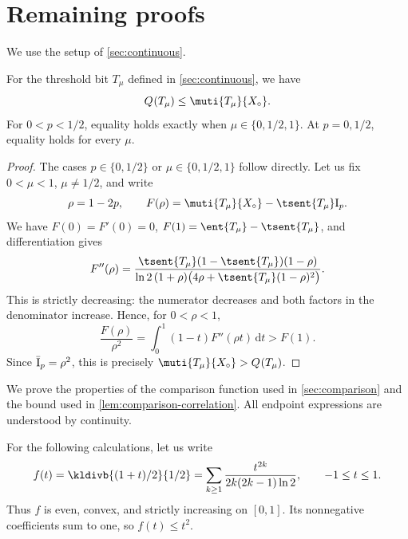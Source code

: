 \section{Remaining proofs}
\label{app:remaining}
\label{app:continuous}
\label{app:comparison}

We use the setup of \autoref{sec:continuous}.

\begin{lemma}
\label{lem:ck+vscontinuous}
For the threshold bit $T_\mu$ defined in \autoref{sec:continuous},
we have
\begin{equation*}
  \qent{T_\mu}\le\muti{T_\mu}{X_\circ}.
\end{equation*}
For $0<p<1/2$, equality holds exactly when $\mu\in\{0,1/2,1\}$.
At $p=0,1/2$, equality holds for every $\mu$.
\end{lemma}
\begin{proof}
The cases $p\in\{0,1/2\}$ or $\mu\in\{0,1/2,1\}$ follow
directly. Let us fix $0<\mu<1$, $\mu\ne1/2$, and write
\begin{equation*}
  \rho=1-2p,\qquad
  F(\rho)=\muti{T_\mu}{X_\circ}-\tsent{T_\mu}\sI.
\end{equation*}
We have $F(0)=F'(0)=0$, $F(1)=\ent{T_\mu}-\tsent{T_\mu}$,
and differentiation gives
\begin{equation*}
  F''(\rho)=
  \frac{\tsent{T_\mu}(1-\tsent{T_\mu})(1-\rho)}
  {\ln2\,(1+\rho)\bigl(4\rho+\tsent{T_\mu}(1-\rho)^2\bigr)}.
\end{equation*}
This is strictly decreasing: the numerator decreases and both
factors in the denominator increase. Hence, for $0<\rho<1$,
\begin{equation*}
  \frac{F(\rho)}{\rho^2}
  =\int_0^1(1-t)F''(\rho t)\,\mathrm{d}t
  >F(1).
\end{equation*}
Since $\bar{\mathrm{I}}_p=\rho^2$, this is precisely
$\muti{T_\mu}{X_\circ}>\qent{T_\mu}$.
\end{proof}
We prove the properties of the comparison function used in
\autoref{sec:comparison} and the bound used in
\autoref{lem:comparison-correlation}.
All endpoint expressions are understood by continuity.

For the following calculations, let us write
\begin{equation*}
  f(t)=\kldivb{(1+t)/2}{1/2}
  =\sum_{k\ge1}\frac{t^{2k}}{2k(2k-1)\ln2},
  \qquad -1\le t\le1.
\end{equation*}
Thus $f$ is even, convex, and strictly increasing on $[0,1]$.
Its nonnegative coefficients sum to one, so $f(t)\le t^2$.

